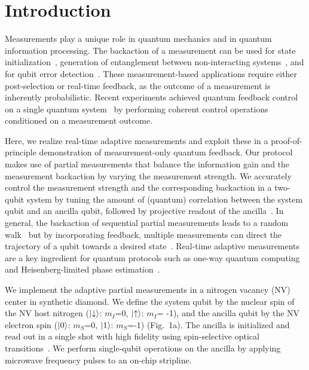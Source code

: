 \section{Introduction}
Measurements play a unique role in quantum mechanics and in quantum information processing. The backaction of a measurement can be used for state initialization~\cite{Robledo_Nature_2011,Riste_PRL_2012}, generation of entanglement between non-interacting systems~\cite{Chou_Nature_2005,Moehring_Nature_2007,Pfaff_NatPhys_2012,Riste_Nature_2013}, and for qubit error detection~\cite{Chiaverini_Nature_2004}. These measurement-based applications require either post-selection or real-time feedback, as the outcome of a measurement is inherently probabilistic. Recent experiments achieved quantum feedback control on a single quantum system~\cite{Riste_Nature_2013, Gillett_PRL_2010,Sayrin_Nature_2011,Vijay_Nature_2012} by performing coherent control operations conditioned on a measurement outcome.

Here, we realize real-time adaptive measurements and exploit these in a proof-of-principle demonstration of measurement-only quantum feedback. Our protocol makes use of partial measurements that balance the information gain and the measurement backaction by varying the measurement strength. We accurately control the measurement strength and the corresponding backaction in a two-qubit system by tuning the amount of (quantum) correlation between the system qubit and an ancilla qubit, followed by projective readout of the ancilla~\cite{Brun_PhysRevA_2008,Groen_PRL_2013}. In general, the backaction of sequential partial measurements leads to a random walk~\cite{Guerlin_Nature_2007,Hatridge_Science_2013,Murch_Nature_2013} but by incorporating feedback, multiple measurements can direct the trajectory of a qubit towards a desired state~\cite{Ashhab_PhysRevA_2010,Wiseman_NatureNV_2011}. Real-time adaptive measurements are a key ingredient for quantum protocols such as one-way quantum computing~\cite{Raussendorf_PRL_2001,Prevedel_Nature_2007} and Heisenberg-limited phase estimation~\cite{Cappellaro_PhysRevA_2012,Higgins_Nature_2007}.

We implement the adaptive partial measurements in a nitrogen vacancy (NV) center in synthetic diamond. We define the system qubit by the nuclear spin of the NV host nitrogen ($\left|\downarrow\right\rangle$: $m_I$=0, $\left|\uparrow\right\rangle$: $m_I$= -1), and the ancilla qubit by the NV electron spin ($\left|0\right\rangle$: $m_S$=0, $\left|1\right\rangle$: $m_S$=-1) (Fig.~1a). The ancilla is initialized and read out in a single shot with high fidelity using spin-selective optical transitions~\cite{Robledo_Nature_2011}. We perform single-qubit operations on the ancilla by applying microwave frequency pulses to an on-chip stripline.

